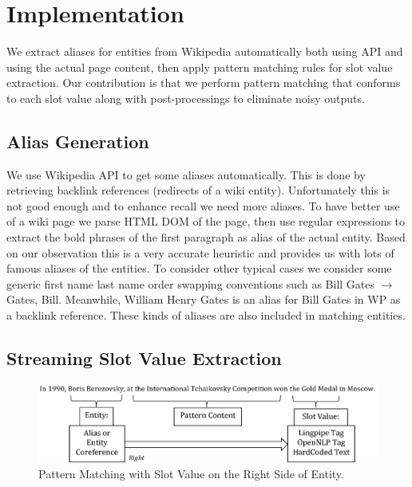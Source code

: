 

\section{Implementation}
\label{section:implementation}

We extract aliases for entities from Wikipedia automatically both using API 
and using the actual page content, then apply pattern matching rules for slot 
value extraction. Our contribution is that we perform pattern matching that conforms to each slot 
value along with post-processings to eliminate noisy outputs. 


\subsection{Alias Generation}
\label{section:aliasgeneration}

We use Wikipedia API to get some aliases automatically. This is done by 
retrieving backlink references (redirects of a wiki entity). Unfortunately 
this is not good enough and to enhance recall we need more aliases. To have 
better use of a wiki page we parse HTML DOM of the page, then use regular 
expressions to extract the bold phrases of the first paragraph as alias of the 
actual entity. Based on our observation this is a very accurate heuristic and 
provides us with lots of famous aliases of the entities. To consider other 
typical cases we consider some generic first name last name order swapping 
conventions such as Bill Gates $\rightarrow$ Gates, Bill.  Meanwhile, William Henry Gates is an alias for Bill Gates in WP as a backlink reference. These kinds of aliases are also included in matching entities. 

\subsection{Streaming Slot Value Extraction}

\begin{figure}
\centering
\includegraphics[width=6in]{./images/Pattern.eps}
\vspace*{-.1in} \caption{Pattern Matching with Slot Value on the Right Side of Entity. }\label{fig:pattern}
\vspace*{-.2in}
\end{figure}

